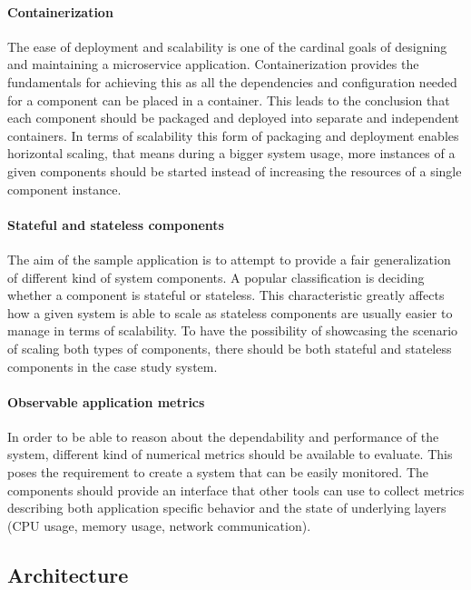 \paragraph{Containerization}The ease of deployment and scalability is one of the cardinal goals of designing and maintaining a microservice application. Containerization provides the fundamentals for achieving this as all the dependencies and configuration needed for a component can be placed in a container. This leads to the conclusion that each component should be packaged and deployed into separate and independent containers.  In terms of scalability this form of packaging and deployment enables horizontal scaling, that means \eg during a bigger system usage, more instances of a given components should be started instead of increasing the resources of a single component instance.

\paragraph{Stateful and stateless components}The aim of the sample application is to attempt to provide a fair generalization of different kind of system components. A popular classification is deciding whether a component is stateful or stateless. This characteristic greatly affects how a given system is able to scale as stateless components are usually easier to manage in terms of scalability. To have the possibility of showcasing the scenario of scaling both types of components, there should be both stateful and stateless components in the case study system.

\paragraph{Observable application metrics}In order to be able to reason about the dependability and performance of the system, different kind of numerical metrics should be available to evaluate. This poses the requirement to create a system that can be easily monitored. The 
components should provide an interface that other tools can use to collect metrics describing both application specific behavior and the state of underlying layers (\eg CPU usage, memory usage, network communication).


\subsection{Architecture}

